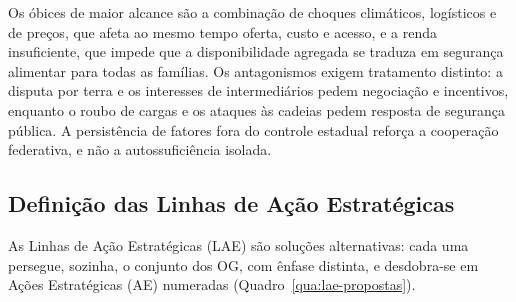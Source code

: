 \documentclass[
	12pt,				%
	openright,			%
	oneside,			%
	a4paper,			%
	chapter=TITLE,		%
	section=TITLE,		%
	english,			%
	french,				%
	spanish,			%
	brazil,				%
 ]{abntex2}
\begin{document}
Os óbices de maior alcance são a combinação de choques climáticos, logísticos e
de preços, que afeta ao mesmo tempo oferta, custo e acesso, e a renda
insuficiente, que impede que a disponibilidade agregada se traduza em segurança
alimentar para todas as famílias. Os antagonismos exigem tratamento distinto:
a disputa por terra e os interesses de intermediários pedem negociação e
incentivos, enquanto o roubo de cargas e os ataques às cadeias pedem resposta de
segurança pública. A persistência de fatores fora do controle estadual reforça a
cooperação federativa, e não a autossuficiência isolada.

\subsection{Definição das Linhas de Ação Estratégicas}
As Linhas de Ação Estratégicas (LAE) são soluções alternativas: cada uma
persegue, sozinha, o conjunto dos OG, com ênfase distinta, e desdobra-se em
Ações Estratégicas (AE) numeradas
(Quadro~\ref{qua:lae-propostas}).
\end{document}
